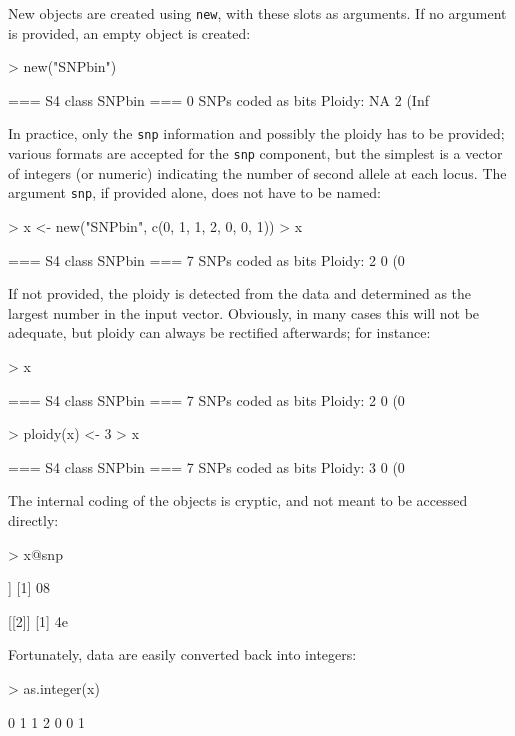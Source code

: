 \documentclass{article}
\begin{document}
New objects are created using \texttt{new}, with these slots as arguments.
If no argument is provided, an empty object is created:
\begin{Schunk}
\begin{Sinput}
> new("SNPbin")
\end{Sinput}
\begin{Soutput}
 === S4 class SNPbin ===
 0 SNPs coded as bits
 Ploidy: NA
 2 (Inf %) missing data
\end{Soutput}
\end{Schunk}
In practice, only the \texttt{snp} information and possibly the ploidy has to be provided; various
formats are accepted for the \texttt{snp} component, but the simplest is a vector of integers (or
numeric) indicating the number of second allele at each locus.
The argument \texttt{snp}, if provided alone, does not have to be named:
\begin{Schunk}
\begin{Sinput}
> x <- new("SNPbin", c(0, 1, 1, 2, 0, 0, 1))
> x
\end{Sinput}
\begin{Soutput}
 === S4 class SNPbin ===
 7 SNPs coded as bits
 Ploidy: 2
 0 (0 %) missing data
\end{Soutput}
\end{Schunk}

If not provided, the ploidy is detected from the data and determined as the largest number in the
input vector. Obviously, in many cases this will not be adequate, but ploidy can always be rectified
afterwards; for instance:
\begin{Schunk}
\begin{Sinput}
> x
\end{Sinput}
\begin{Soutput}
 === S4 class SNPbin ===
 7 SNPs coded as bits
 Ploidy: 2
 0 (0 %) missing data
\end{Soutput}
\begin{Sinput}
> ploidy(x) <- 3
> x
\end{Sinput}
\begin{Soutput}
 === S4 class SNPbin ===
 7 SNPs coded as bits
 Ploidy: 3
 0 (0 %) missing data
\end{Soutput}
\end{Schunk}

\noindent The internal coding of the objects is cryptic, and not meant to be accessed directly:
\begin{Schunk}
\begin{Sinput}
> x@snp
\end{Sinput}
\begin{Soutput}
[[1]]
[1] 08

[[2]]
[1] 4e
\end{Soutput}
\end{Schunk}
Fortunately, data are easily converted back into integers:
\begin{Schunk}
\begin{Sinput}
> as.integer(x)
\end{Sinput}
\begin{Soutput}
[1] 0 1 1 2 0 0 1
\end{Soutput}
\end{Schunk}
\end{document}
